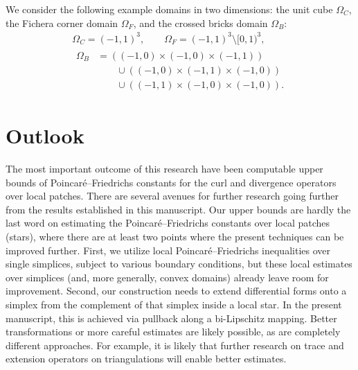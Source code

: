 \documentclass[10pt,a4paper]{article}
\newcommand{\mwl}[1]{{\color{red}#1}}
\begin{document}
We consider the following example domains in two dimensions:
the unit cube $\Omega_C$, the Fichera corner domain $\Omega_F$, and the crossed bricks domain $\Omega_{B}$:
\begin{gather*}
    \Omega_{C}  = (-1,1)^3,
    \qquad 
    \Omega_{F}  = (-1,1)^3 \setminus [0,1)^3,
    \\
    \begin{aligned}
    \Omega_{B} &= 
    \left( (-1,0) \times (-1,0) \times (-1,1) \right)
    \\&\qquad
    \cup 
    \left( (-1,0) \times (-1,1) \times (-1,0) \right)
    \\&\qquad
    \cup 
    \left( (-1,1) \times (-1,0) \times (-1,0) \right)
    .
    \end{aligned}
\end{gather*}





\section{Outlook}\label{section:outlook}

The most important outcome of this research have been computable upper bounds of Poincar\'e--Friedrichs constants for the curl and divergence operators over local patches. 
There are several avenues for further research going further from the results established in this manuscript.
Our upper bounds are hardly the last word on estimating the Poincar\'e--Friedrichs constants over local patches (stars), where there are at least two points where the present techniques can be improved further. First, we utilize local Poincar\'e--Friedrichs inequalities over single simplices, subject to various boundary conditions, but these local estimates over simplices (and, more generally, convex domains) \mwl{already} leave room for improvement.
Second, our construction needs to extend differential forms onto a simplex from the complement of that simplex inside a local star. In the present manuscript, this is achieved via pullback along a bi-Lipschitz mapping. 
Better transformations or more careful estimates are likely possible, as are completely different approaches. For example, it is likely that further research on trace and extension operators on triangulations will enable better estimates.
\end{document}

